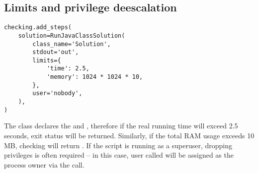 \subsection{Limits and privilege deescalation}

\begin{verbatim}
checking.add_steps(
    solution=RunJavaClassSolution(
        class_name='Solution',
        stdout='out',
        limits={
            'time': 2.5,
            'memory': 1024 * 1024 * 10,
        },
        user='nobody',
    ),
)
\end{verbatim}

The  class declares the \hyperref[subsec:UsedTimePostcondition]{}
and \hyperref[subsec:UsedMemoryPostcondition]{}, therefore if the real running time will
exceed 2.5 seconds,  exit status will be returned.
Similarly, if the total RAM usage exceeds 10 MB, checking will return .
If the script is running as a superuser, dropping privileges is often required -- in this case, user called  will
be assigned as the process owner via the  call.
